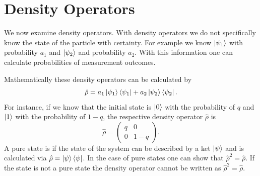 \documentclass[twocolumn]{article}
\begin{document}
\section*{Density Operators}
We now examine density operators. With density operators we do not specifically know the state of the particle with certainty. For example we know $\ket{\psi_1}$ with probability $a_1$ and $\ket{\psi_2}$ and probability $a_2$. With this information one can calculate probabilities of measurement outcomes. 

Mathematically these density operators can be calculated by
\begin{equation} \label{Eq: DOD}
\hat{\rho}=a_1\ket{\psi_1}\bra{\psi_1}+a_2\ket{\psi_2}\bra{\psi_2}.
\end{equation}
For instance, if we know that the initial state is $\ket{0}$ with the probability of $q$ and $\ket{1}$ with the probability of $1-q$, the respective density operator $\hat{\rho}$ is
\begin{equation} \label{Eq: DOMD}
\hat{\rho}=
\begin{pmatrix}
q & 0 \\
0 & 1-q
\end{pmatrix}.
\end{equation}
A pure state is if the state of the system can be described by a ket $\ket{\psi}$ and is calculated via $\hat{\rho}=\ket{\psi}\bra{\psi}$. In the case of pure states one can show that $\hat{\rho}^2=\hat{\rho}$. If the state is not a pure state the density operator cannot be written as $\hat{\rho}^2=\hat{\rho}$. 
\end{document}
